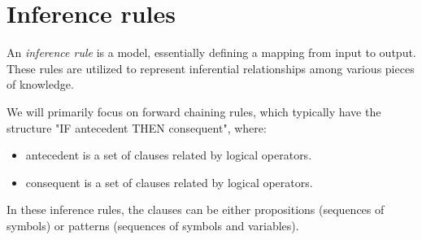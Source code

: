 \section{Inference rules}

\begin{definition}
    An \emph{inference rule} is a model, essentially defining a mapping from input to output. 
    These rules are utilized to represent inferential relationships among various pieces of knowledge.
\end{definition}
We will primarily focus on forward chaining rules, which typically have the structure "IF antecedent THEN consequent", where: 
\begin{itemize}
    \item antecedent is a set of clauses related by logical operators.
    \item consequent is a set of clauses related by logical operators.
\end{itemize}
In these inference rules, the clauses can be either propositions (sequences of symbols) or patterns (sequences of symbols and variables).

